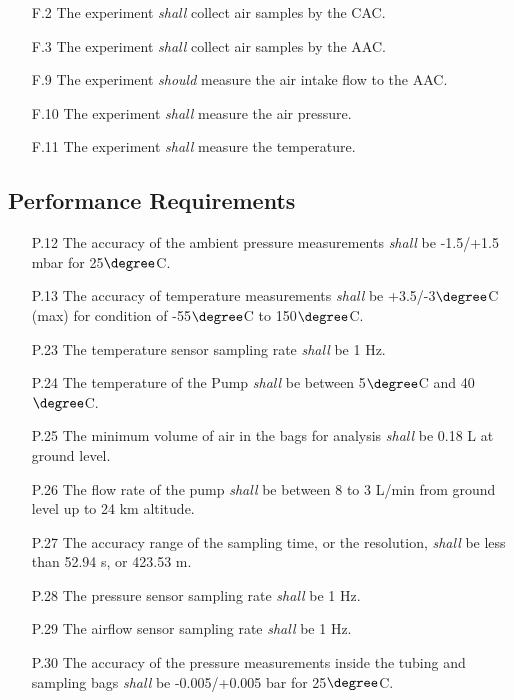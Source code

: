 \documentclass[a4paper,12pt,twoside]{article}
\begin{document}
\begin{enumerate}
    \item[F.2] The experiment \textit{shall} collect air samples by the CAC.
    \item[F.3] The experiment \textit{shall} collect air samples by the AAC.
    \item[F.9] The experiment \textit{should} measure the air intake flow to the AAC.
    \item[F.10] The experiment \textit{shall} measure the air pressure.
    \item[F.11] The experiment \textit{shall} measure the temperature.
\end{enumerate}
\subsection{Performance Requirements}

\begin{enumerate}
    \item[P.12] The accuracy of the ambient pressure measurements \textit{shall} be -1.5/+1.5 mbar for 25$\degree$C.
    \item[P.13] The accuracy of temperature measurements \textit{shall} be +3.5/-3$\degree$C (max) for condition of -55$\degree$C to 150$\degree$C.
    \item[P.23] The temperature sensor sampling rate \textit{shall} be 1 Hz.\label{newsamplerate}
    \item[P.24] The temperature of the Pump \textit{shall} be between 5$\degree$C and 40$\degree$C. 
    \item[P.25] The minimum volume of air in the bags for analysis \textit{shall} be 0.18 L at ground level.
    \item[P.26] The flow rate of the pump \textit{shall} be between 8 to 3 L/min from ground level up to 24 km altitude.
    \item[P.27] The accuracy range of the sampling time, or the resolution, \textit{shall} be less than 52.94 s, or 423.53 m.
    \item[P.28] The pressure sensor sampling rate \textit{shall} be 1 Hz.\label{newsamplerate}
    \item[P.29] The airflow sensor sampling rate \textit{shall} be 1 Hz.\label{newsamplerate}
    \item[P.30] The accuracy of the pressure measurements inside the tubing and sampling bags \textit{shall} be -0.005/+0.005 bar for 25$\degree$C.

 \end{enumerate} 
\pagebreak
\end{document}
